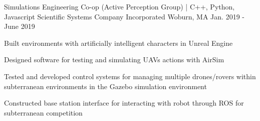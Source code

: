 \begin{cventries}
  \cventry
    {Simulations Engineering Co-op (Active Perception Group) | C++, Python, Javascript} %
    {Scientific Systems Company Incorporated} %
    {Woburn, MA} %
    {Jan. 2019 - June 2019} %
    {
      \begin{cvitems} %
        \item {Built environments with artificially intelligent characters in Unreal Engine}
        \item {Designed software for testing and simulating UAVs actions with AirSim}
        \item {Tested and developed control systems for managing multiple drones/rovers within subterranean environments in 
               the Gazebo simulation environment}
        \item {Constructed base station interface for interacting with robot through ROS for subterranean competition}
      \end{cvitems}
    }
\end{cventries}
